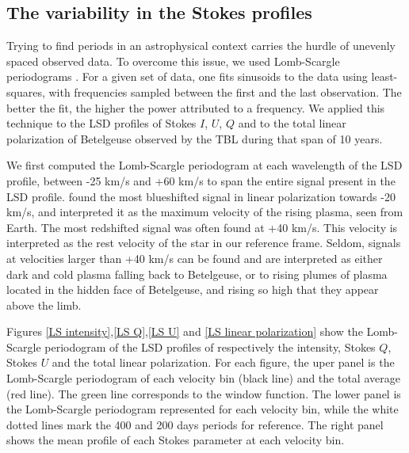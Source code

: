 \documentclass{aa}
\begin{document}
\subsection{The variability in the Stokes profiles}


Trying to find periods in an astrophysical context carries the hurdle of unevenly spaced observed data. To overcome this issue, 
we used  Lomb-Scargle periodograms \citep{lomb_least-squares_1976,scargle_studies_1982}. For a given set of data, one fits sinusoids to the data
using least-squares, with frequencies sampled between the first and the last observation. The better the fit, the higher the power attributed to a frequency. 
We applied this technique to the  LSD profiles of Stokes $I$, $U$, $Q$ and to the total linear polarization of Betelgeuse observed by the TBL during 
that span of 10 years. 


We first computed the Lomb-Scargle periodogram at each wavelength of the LSD profile, between -25 km/s and +60 km/s to span the entire 
signal present in the LSD profile. \cite{lopez_ariste_convective_2018} found the most blueshifted signal in linear polarization  towards -20 km/s, 
and interpreted it as  the maximum velocity of the rising plasma, seen from  Earth. The most redshifted signal was often found at +40 km/s. 
This velocity is interpreted
as the rest velocity of the star in our reference frame. Seldom, signals at velocities larger than +40 km/s can be found 
and are interpreted as either dark and cold plasma falling back to Betelgeuse, 
or to rising plumes of plasma located in the hidden face of Betelgeuse,
and rising so high that they appear above the limb.






Figures \ref{LS intensity},\ref{LS Q},\ref{LS U} and \ref{LS linear polarization} show the Lomb-Scargle periodogram of the LSD profiles of respectively 
the intensity, Stokes $Q$, Stokes $U$ and the total linear polarization. 
For each figure, the uper panel is the Lomb-Scargle periodogram of each velocity bin (black line) and the total average (red line). The green line corresponds to the window function. 
The lower panel is the Lomb-Scargle periodogram represented for each velocity bin, while the white dotted lines mark the 400 and 200 days periods for 
reference. The right panel shows the mean profile of each Stokes parameter at each velocity bin.
\end{document}
